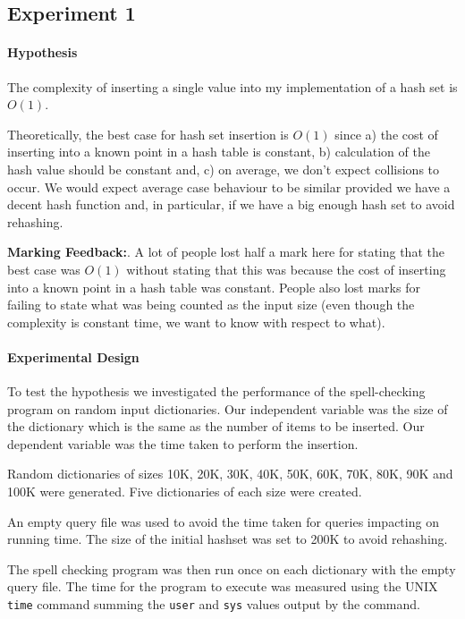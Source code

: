 \subsection{Experiment 1}

\paragraph{Hypothesis} The complexity of inserting a single value into my implementation of a hash set is $O(1)$. 

Theoretically, the best case for hash set insertion is $O(1)$ since a) the cost of inserting into a known point in a hash table is constant, b) calculation of the hash value should be constant and, c) on average, we don't expect collisions to occur.  We would expect average case behaviour to be similar provided we have a decent hash function and, in particular, if we have a big enough hash set to avoid rehashing.  

{\bf Marking Feedback:}. A lot of people lost half a mark here for stating that the best case was $O(1)$ without stating that this was because the cost of inserting into a known point in a hash table was constant.  People also lost marks for failing to state what was being counted as the input size (even though the complexity is constant time, we want to know with respect to what).

\paragraph{Experimental Design} 

To test the hypothesis we investigated the performance of the spell-checking program on random input dictionaries.  Our independent variable was the size of the dictionary which is the same as the number of items to be inserted.  Our dependent variable was the time taken to perform the insertion.

Random dictionaries of sizes 10K, 20K, 30K, 40K, 50K, 60K, 70K, 80K, 90K and 100K were generated.  Five dictionaries of each size were created.

An empty query file was used to avoid the time taken for queries impacting on running time.  The size of the initial hashset was set to 200K to avoid rehashing.  

The spell checking program was then run once on each dictionary with the empty query file.  The time for the program to execute was measured using the UNIX \texttt{time} command summing the \texttt{user} and \texttt{sys} values output by the command.  

